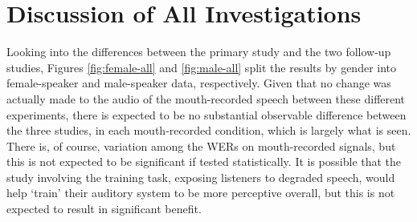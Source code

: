 % 
% 



\section{Discussion of All Investigations}
\label{chap3:glob_discussion}

Looking into the differences between the primary study and the two follow-up studies, Figures \ref{fig:female-all} and \ref{fig:male-all} split the results by gender into female-speaker and male-speaker data, respectively.  Given that no change was actually made to the audio of the mouth-recorded speech between these different experiments, there is expected to be no substantial observable difference between the three studies, in each mouth-recorded condition, which is largely what is seen.  There is, of course, variation among the WERs on mouth-recorded signals, but this is not expected to be significant if tested statistically.  It is possible that the study involving the training task, exposing listeners to degraded speech, would help `train' their auditory system to be more perceptive overall, but this is not expected to result in significant benefit.




